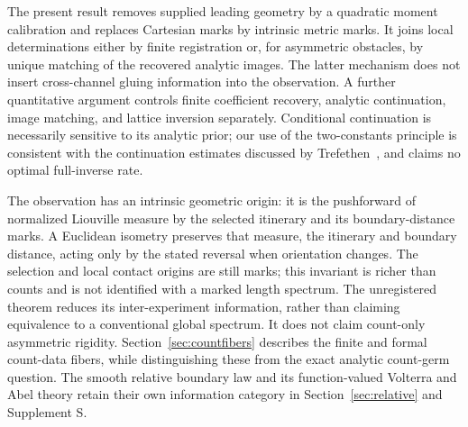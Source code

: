 The present result removes supplied leading geometry by a quadratic
moment calibration and replaces Cartesian marks by intrinsic metric
marks. It joins local determinations either by finite registration or,
for asymmetric obstacles, by unique matching of the recovered analytic
images. The latter mechanism does not insert cross-channel gluing
information into the observation. A further quantitative argument controls
finite coefficient recovery, analytic continuation, image matching, and
lattice inversion separately. Conditional continuation is necessarily
sensitive to its analytic prior; our use of the two-constants principle
is consistent with the continuation estimates discussed by
Trefethen~\cite{Trefethen}, and claims no optimal full-inverse rate.

The observation has an intrinsic geometric origin: it is the pushforward
of normalized Liouville measure by the selected itinerary and its
boundary-distance marks. A Euclidean isometry preserves that measure,
the itinerary and boundary distance, acting only by the stated reversal
when orientation changes. The selection and local contact origins are
still marks; this invariant is richer than counts and is not identified
with a marked length spectrum. The unregistered theorem reduces its
inter-experiment information, rather than claiming equivalence to a
conventional global spectrum. It does
not claim count-only asymmetric rigidity. Section~\ref{sec:countfibers}
describes the finite and formal count-data fibers, while distinguishing
these from the exact analytic count-germ question. The smooth relative
boundary law and its function-valued Volterra and Abel theory retain their
own information category in Section~\ref{sec:relative} and Supplement S.
